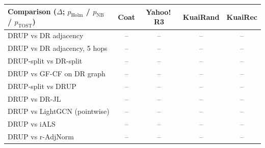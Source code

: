 \begin{tabular}{lcccc}
\toprule
Comparison ($\Delta$; $p_{\mathrm{Holm}}$ / $p_{\mathrm{NB}}$ / $p_{\mathrm{TOST}}$) & Coat & Yahoo!\,R3 & KuaiRand & KuaiRec\\
\midrule
DRUP vs DR adjacency & -- & -- & -- & --\\
DRUP vs DR adjacency, 5 hops & -- & -- & -- & --\\
DRUP-split vs DR-split & -- & -- & -- & --\\
DRUP vs GF-CF on DR graph & -- & -- & -- & --\\
DRUP-split vs DRUP & -- & -- & -- & --\\
DRUP vs DR-JL & -- & -- & -- & --\\
DRUP vs LightGCN (pointwise) & -- & -- & -- & --\\
DRUP vs iALS & -- & -- & -- & --\\
DRUP vs r-AdjNorm & -- & -- & -- & --\\
\bottomrule
\end{tabular}
